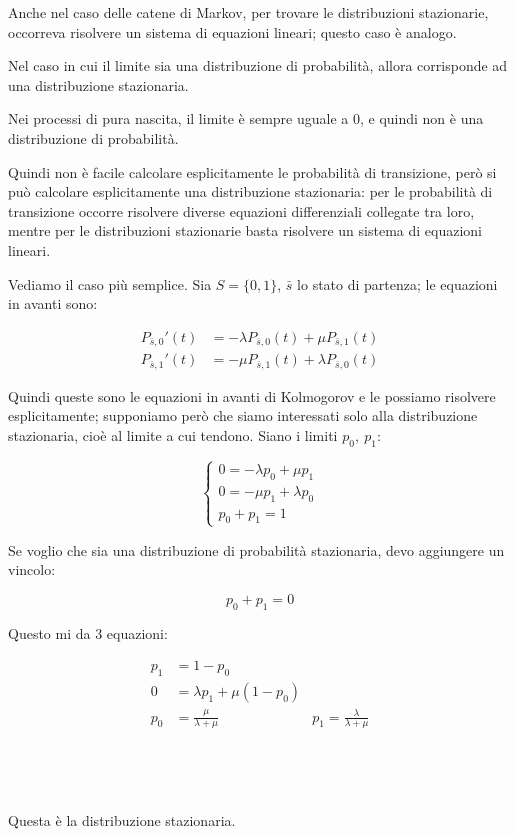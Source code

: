 \documentclass[a4paper,12pt]{book}
\begin{document}
Anche nel caso delle catene di Markov, per trovare le distribuzioni stazionarie, occorreva risolvere un sistema di equazioni lineari; questo caso è analogo. 

Nel caso in cui il limite sia una distribuzione di probabilità, allora corrisponde ad una distribuzione stazionaria. 

Nei processi di pura nascita, il limite è sempre uguale a 0, e quindi non è una distribuzione di probabilità.

Quindi non è facile calcolare esplicitamente le probabilità di transizione, però si può calcolare esplicitamente una distribuzione stazionaria: per le probabilità di transizione occorre risolvere diverse equazioni differenziali collegate tra loro, mentre per le distribuzioni stazionarie basta risolvere un sistema di equazioni lineari. 

Vediamo il caso più semplice. Sia $ S = \{0,1\} $, $ \bar{s} $ lo stato di partenza; le equazioni in avanti sono:

\begin{align*}
	P_{\bar{s},0}'(t) & = -\lambda P_{\bar{s},0}(t) + \mu P_{\bar{s},1}(t) \\
	P_{\bar{s},1}'(t) & = -\mu P_{\bar{s},1}(t) + \lambda P_{\bar{s},0}(t)
\end{align*}

Quindi queste sono le equazioni in avanti di Kolmogorov e le possiamo risolvere esplicitamente; supponiamo però che siamo interessati solo alla distribuzione stazionaria, cioè al limite a cui tendono. Siano i limiti $ p_0,\ p_1 $: 

$$
\begin{cases}
	0 = -\lambda p_0 + \mu p_1 \\
	0 = -\mu p_1 + \lambda p_0 \\
	p_0 + p_1 = 1
\end{cases}
$$

Se voglio che sia una distribuzione di probabilità stazionaria, devo aggiungere un vincolo:

$$ p_0 + p_1 = 0 $$

Questo mi da 3 equazioni:

\begin{multicols}{2}
	\begin{align*}
	p_1 & = 1-p_0 \\
	0 & = \lambda p_1 + \mu(1 - p_0) \\
	p_0 & = \frac{\mu}{\lambda + \mu} & p_1 = \frac{\lambda}{\lambda + \mu}
	\end{align*}
	\\
	\\
	\\
	\\
	Questa è la distribuzione stazionaria. 
\end{multicols}
\end{document}
